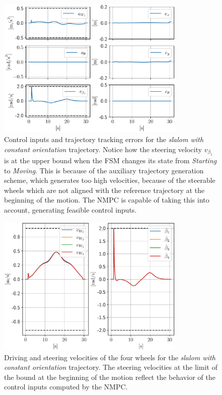 \begin{figure}
    \centering
    \includegraphics[width=0.8\textwidth]{figures/SWMR/simulations/slalom_with_constant_orientation/inputs_and_errors.pdf}
    \caption{Control inputs and trajectory tracking errors for the
        \textit{slalom with constant orientation} trajectory. Notice how 
        the steering velocity $v_{\beta_1}$ is at the upper bound when 
        the FSM changes its state from \textit{Starting} to \textit{Moving}.
        This is because of the auxiliary trajectory generation scheme, which 
        generates too high velocities, because of the steerable wheels which
        are not aligned with the reference trajectory at the beginning of 
        the motion. The NMPC is capable of taking this into account, generating
        feasible control inputs.
    }
    \label{fig:simulations:slalom-with-constant-orientation:inputs-and-errors}
\end{figure}
\begin{figure}
    \centering
    \includegraphics[width=0.8\textwidth]{figures/SWMR/simulations/slalom_with_constant_orientation/wheels_velocities.pdf}
    \caption{Driving and steering velocities of the four wheels for the
        \textit{slalom with constant orientation} trajectory. The steering 
        velocities at the limit of the bound at the beginning of the motion 
        reflect the behavior of the control inputs computed by the NMPC.
    }
    \label{fig:simulations:slalom-with-constant-orientation:wheel-velocities}
\end{figure}

